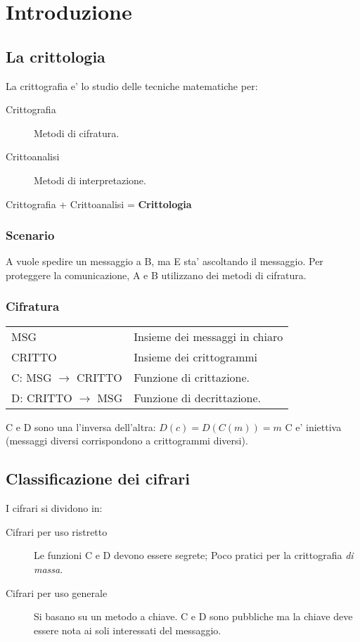 \chapter{Introduzione}
\section{La crittologia}
La crittografia e' lo studio delle tecniche matematiche per:
\begin{description}
    \item[Crittografia] Metodi di cifratura.
    \item[Crittoanalisi] Metodi di interpretazione. 
\end{description}
\begin{center}
    Crittografia + Crittoanalisi = \textbf{Crittologia}
\end{center}
\subsection{Scenario}
A vuole spedire un messaggio a B, ma E sta' ascoltando il messaggio.
Per proteggere la comunicazione, A e B utilizzano dei metodi di cifratura.
\subsection{Cifratura}
\begin{tabular}{l | l}
    MSG & Insieme dei messaggi in chiaro\\
    CRITTO & Insieme dei crittogrammi\\
    C: MSG $\rightarrow$ CRITTO & Funzione di crittazione.\\
    D: CRITTO $\rightarrow$ MSG & Funzione di decrittazione.
\end{tabular}
C e D sono una l'inversa dell'altra: $D(c) = D(C(m)) = m$\newline
C e' iniettiva (messaggi diversi corrispondono a crittogrammi diversi).
\section{Classificazione dei cifrari}
I cifrari si dividono in:
\begin{description}
    \item[Cifrari per uso ristretto] Le funzioni C e D devono essere {\color{red}segrete}; Poco pratici per la crittografia \textit{di massa}.
    \item[Cifrari per uso generale] Si basano su un metodo a {\color{blue}chiave}. C e D sono pubbliche ma la chiave deve essere nota ai soli interessati del messaggio.
\end{description}
